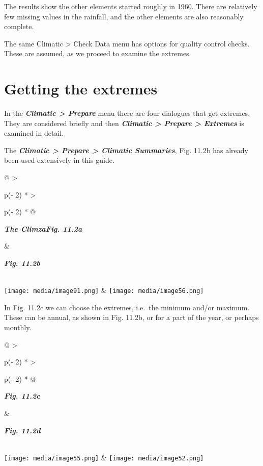 \documentclass[
  letterpaper,
  DIV=11,
  numbers=noendperiod]{scrreprt}
\begin{document}
The results show the other elements started roughly in 1960. There are
relatively few missing values in the rainfall, and the other elements
are also reasonably complete.

The same Climatic \textgreater{} Check Data menu has options for quality
control checks. These are assumed, as we proceed to examine the
extremes.

\section{Getting the extremes}\label{getting-the-extremes}

In the \textbf{\emph{Climatic \textgreater{} Prepare}} menu there are
four dialogues that get extremes. They are considered briefly and then
\textbf{\emph{Climatic \textgreater{} Prepare \textgreater{} Extremes}}
is examined in detail.

The \textbf{\emph{Climatic \textgreater{} Prepare \textgreater{}
Climatic Summaries}}, Fig. 11.2b has already been used extensively in
this guide.

\begin{longtable}[]{@{}
  >{\raggedright\arraybackslash}p{(\columnwidth - 2\tabcolsep) * }
  >{\raggedright\arraybackslash}p{(\columnwidth - 2\tabcolsep) * }@{}}
\toprule\noalign{}
\begin{minipage}[b]{\linewidth}\raggedright
\textbf{\emph{The ClimzaFig. 11.2a}}
\end{minipage} & \begin{minipage}[b]{\linewidth}\raggedright
\textbf{\emph{Fig. 11.2b}}
\end{minipage} \\
\midrule\noalign{}
\endhead
\bottomrule\noalign{}
\endlastfoot
\texttt{[image: media/image91.png]} &
\texttt{[image: media/image56.png]} \\
\end{longtable}

In Fig. 11.2c we can choose the extremes, i.e.~the minimum and/or
maximum. These can be annual, as shown in Fig. 11.2b, or for a part of
the year, or perhaps monthly.

\begin{longtable}[]{@{}
  >{\raggedright\arraybackslash}p{(\columnwidth - 2\tabcolsep) * }
  >{\raggedright\arraybackslash}p{(\columnwidth - 2\tabcolsep) * }@{}}
\toprule\noalign{}
\begin{minipage}[b]{\linewidth}\raggedright
\textbf{\emph{Fig. 11.2c}}
\end{minipage} & \begin{minipage}[b]{\linewidth}\raggedright
\textbf{\emph{Fig. 11.2d}}
\end{minipage} \\
\midrule\noalign{}
\endhead
\bottomrule\noalign{}
\endlastfoot
\texttt{[image: media/image55.png]} &
\texttt{[image: media/image52.png]} \\
\end{longtable}
\end{document}
